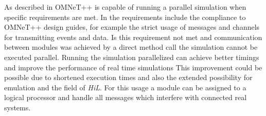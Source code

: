 As described in \cite{varga_parallel_2003} OMNeT++ is capable of running a parallel simulation when specific requirements are met.
In \cite{varga_parallel_2003} the requirements include the compliance to OMNeT++ design guides, for example the strict usage of messages and channels for transmitting events and data.
Is this requirement not met and communication between modules was achieved by a direct method call the simulation cannot be executed parallel.
Running the simulation parallelized can achieve better timings and improve the performance of real time simulations
This improvement could be possible due to shortened execution times and also the extended possibility for emulation and the field of \emph{HiL}.
For this usage a module can be assigned to a logical processor and handle all messages which interfere with connected real systems.

